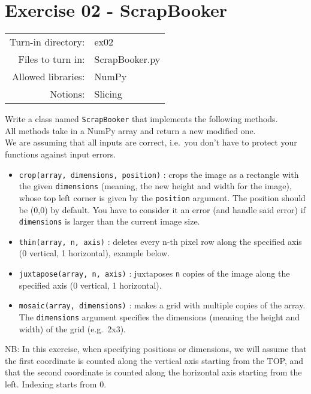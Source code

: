 \documentclass[]{article}
\begin{document}
\clearpage

\hypertarget{exercise-02---scrapbooker-1}{%
\section{Exercise 02 - ScrapBooker}\label{exercise-02---scrapbooker-1}}

\begin{longtable}[]{@{}rl@{}}
\toprule
\endhead
Turn-in directory: & ex02\tabularnewline
Files to turn in: & ScrapBooker.py\tabularnewline
Allowed libraries: & NumPy\tabularnewline
Notions: & Slicing\tabularnewline
\bottomrule
\end{longtable}

Write a class named \texttt{ScrapBooker} that implements the following
methods.\\
All methods take in a NumPy array and return a new modified one.\\
We are assuming that all inputs are correct, i.e.~you don't have to
protect your functions against input errors.

\begin{itemize}
\item
  \texttt{crop(array,\ dimensions,\ position)} : crops the image as a
  rectangle with the given \texttt{dimensions} (meaning, the new height
  and width for the image), whose top left corner is given by the
  \texttt{position} argument. The position should be (0,0) by default.
  You have to consider it an error (and handle said error) if
  \texttt{dimensions} is larger than the current image size.
\item
  \texttt{thin(array,\ n,\ axis)} : deletes every n-th pixel row along
  the specified axis (0 vertical, 1 horizontal), example below.
\item
  \texttt{juxtapose(array,\ n,\ axis)} : juxtaposes \texttt{n} copies of
  the image along the specified axis (0 vertical, 1 horizontal).
\item
  \texttt{mosaic(array,\ dimensions)} : makes a grid with multiple
  copies of the array. The \texttt{dimensions} argument specifies the
  dimensions (meaning the height and width) of the grid (e.g.~2x3).
\end{itemize}

NB: In this exercise, when specifying positions or dimensions, we will
assume that the first coordinate is counted along the vertical axis
starting from the TOP, and that the second coordinate is counted along
the horizontal axis starting from the left. Indexing starts from 0.
\end{document}
